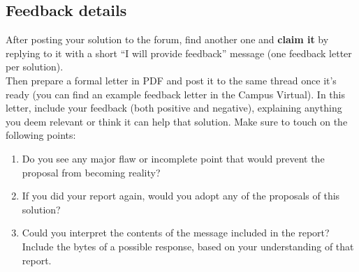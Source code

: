 \subsection*{Feedback details}

After posting your solution to the forum, find another one and \textbf{claim it} by replying to it with a short ``I will provide feedback'' message (one feedback letter per solution).\\

\noindent
Then prepare a formal letter in PDF and post it to the same thread once it's ready (you can find an example feedback letter in the Campus Virtual). In this letter, include your feedback (both positive and negative), explaining anything you deem relevant or think it can help that solution.  Make sure to touch on the following points:

\begin{enumerate}[itemsep=0.1cm]
\item Do you see any major flaw or incomplete point that would prevent the proposal from becoming reality?
\item If you did your report again, would you adopt any of the proposals of this solution?
\item Could you interpret the contents of the message included in the report? Include the bytes of a possible response, based on your understanding of that report.
\end{enumerate}
